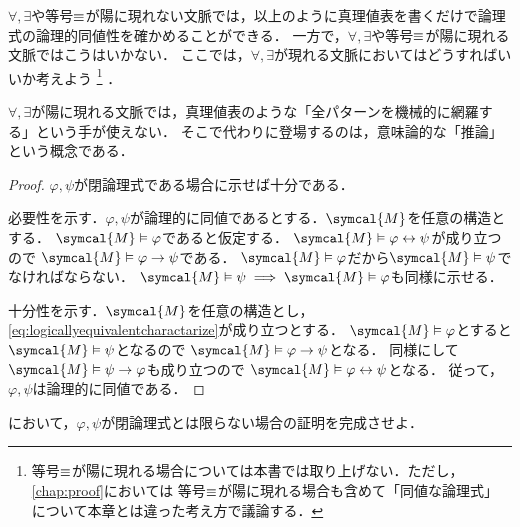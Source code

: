 \(\forall, \exists\)や等号\(\equiv\)が陽に現れない文脈では，以上のように真理値表を書くだけで論理式の論理的同値性を確かめることができる．
一方で，\(\forall, \exists\)や等号\(\equiv\)が陽に現れる文脈ではこうはいかない．
ここでは，\(\forall, \exists\)が現れる文脈においてはどうすればいいか考えよう%
\footnote{%
	等号\(\equiv\)が陽に現れる場合については本書では取り上げない．ただし，\cref{chap:proof}においては
	等号\(\equiv\)が陽に現れる場合も含めて「同値な論理式」について本章とは違った考え方で議論する．
}%
．

\(\forall, \exists\)が陽に現れる文脈では，真理値表のような「全パターンを機械的に網羅する」という手が使えない．
そこで代わりに登場するのは，意味論的な「推論」という概念である．


\begin{proof}
	\(\varphi, \psi\)が閉論理式である場合に示せば十分である．

	必要性を示す．\(\varphi, \psi\)が論理的に同値であるとする．\(\symcal{M}\)を任意の構造とする．
	\(\symcal{M} \satisfy \varphi\)であると仮定する．
	\(\symcal{M} \satisfy \varphi \formulaequiv \psi\)が成り立つので
	\(\symcal{M} \satisfy \varphi \to \psi\)である．
	\(\symcal{M} \satisfy \varphi\)だから\(\symcal{M} \satisfy \psi\)でなければならない．
	\(\symcal{M} \satisfy \psi \metaimplies \symcal{M} \satisfy \varphi\)も同様に示せる．

	十分性を示す．\(\symcal{M}\)を任意の構造とし，
	\cref{eq:logicallyequivalentcharactarize}が成り立つとする．
	\(\symcal{M} \satisfy \varphi\)とすると\(\symcal{M} \satisfy \psi\)となるので
	\(\symcal{M} \satisfy \varphi \to \psi\)となる．
	同様にして\(\symcal{M} \satisfy \psi \to \varphi\)も成り立つので
	\(\symcal{M} \satisfy \varphi \formulaequiv \psi\)となる．
	従って，\(\varphi, \psi\)は論理的に同値である．
\end{proof}

\begin{Que} \label{Que:logicallyequivalentcharactarize}
	において，\(\varphi, \psi\)が閉論理式とは限らない場合の証明を完成させよ．
\end{Que}


